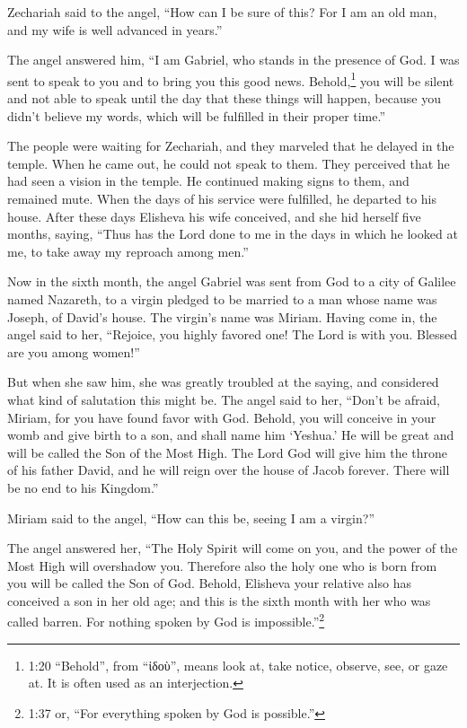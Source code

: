 \myverse{}Zechariah said to the angel, “How can I be sure of this? For
I am an old man, and my wife is well advanced in years.”

\myverse{}The angel answered him, “I am Gabriel, who stands in the presence
of God. I was sent to speak to you and to bring you this good news.
\myverse{}Behold,\footnote{1:20 “Behold”, from “ἰδοὺ”, means look at, take notice, observe, see, or gaze at. It is often used
	as an interjection.} you will be silent and not able to speak until the day that these things
will happen, because you didn’t believe my words, which will be fulfilled in their proper time.”

\myverse{}The people were waiting for Zechariah, and they marveled that
he delayed in the temple.
\myverse{}When he came out, he could not speak to them. They perceived that he had seen
a vision in the temple. He continued making signs to them, and remained mute.
\myverse{}When the days of his service were fulfilled, he departed to his house.
\myverse{}After these days Elisheva his wife conceived, and she hid herself five months,
saying,
\myverse{}“Thus has the Lord done to me in the days in which he looked at me, to take
away my reproach among men.”

\myverse{}Now in the sixth month, the angel Gabriel was sent from God to
a city of Galilee named Nazareth,
\myverse{}to a virgin pledged to be married to a man whose name was Joseph, of David’s
house. The virgin’s name was Miriam.
\myverse{}Having come in, the angel said to her, “Rejoice, you highly favored one! The
Lord is with you. Blessed are you among women!”

\myverse{}But when she saw him, she was greatly troubled at the saying,
and considered what kind of salutation this might be.
\myverse{}The angel said to her, “Don’t be afraid, Miriam, for you have found favor
with God.
\myverse{}Behold, you will conceive in your womb and give birth to a son, and shall
name him ‘Yeshua.’
\myverse{}He will be great and will be called the Son of the Most High. The Lord God
will give him the throne of his father David,
\myverse{}and he will reign over the house of Jacob forever. There will be no end to
his Kingdom.”

\myverse{}Miriam said to the angel, “How can this be, seeing I am a virgin?”

\myverse{}The angel answered her, “The Holy Spirit will come on you, and
the power of the Most High will overshadow you. Therefore also the holy one who is born from you will
be called the Son of God.
\myverse{}Behold, Elisheva your relative also has conceived a son in her old age; and
this is the sixth month with her who was called barren.
\myverse{}For nothing spoken by God is impossible.”\footnote{1:37 or, “For everything spoken by God is possible.”}

